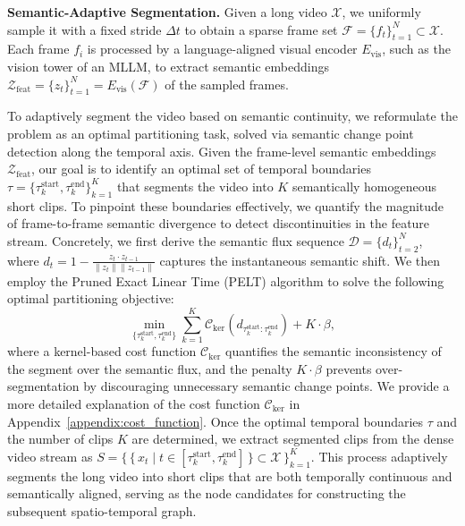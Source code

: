 \clearpage
\setcounter{page}{1}
\maketitlesupplementary


\noindent\textbf{Semantic-Adaptive Segmentation.} Given a long video $\mathcal{X}$, we uniformly sample it with a fixed stride $\Delta t$ to obtain a sparse frame set $\mathcal{F} = \{ f_t \}_{t=1}^{N} \subset \mathcal{X}$. Each frame $f_i$ is processed by a language-aligned visual encoder $E_{\mathrm{vis}}$, such as the vision tower of an MLLM, to extract semantic embeddings $ \mathcal{Z}_{\text{feat}} = \{ z_t \}_{t=1}^{N} = E_{\mathrm{vis}}(\mathcal{F})$ of the sampled frames.

To adaptively segment the video based on semantic continuity, we reformulate the problem as an optimal partitioning task, solved via semantic change point detection along the temporal axis. Given the frame-level semantic embeddings $\mathcal{Z}_\text{feat}$, our goal is to identify an optimal set of temporal boundaries $\tau = \{\tau_k^{\text{start}}, \tau_k^{\text{end}}\}_{k=1}^{K}$ that segments the video into $K$ semantically homogeneous short clips. To pinpoint these boundaries effectively, we quantify the magnitude of frame-to-frame semantic divergence to detect discontinuities in the feature stream. Concretely, we first derive the semantic flux sequence $\mathcal{D}=\{d_t\}_{t=2}^N$, where $d_t = 1 - \frac{z_t \cdot z_{t-1}}{\|z_t\|\|z_{t-1}\|}$ captures the instantaneous semantic shift. We then employ the Pruned Exact Linear Time (PELT) algorithm to solve the following optimal partitioning objective:
\begin{equation}
\min_{\{ \tau_k^{\text{start}}, \tau_k^{\text{end}} \}}
\sum_{k=1}^K \mathcal{C}_{\text{ker}}(d_{\tau_k^{\text{start}} : \tau_k^{\text{end}}})
+ K \cdot \beta,
\end{equation}
where a kernel-based cost function $\mathcal{C}_{\text{ker}}$ quantifies the semantic inconsistency of the segment over the semantic flux, and the penalty $K\cdot\beta$ prevents over-segmentation by discouraging unnecessary semantic change points. We provide a more detailed explanation of the cost function $\mathcal{C}_{\text{ker}}$ in Appendix~\ref{appendix:cost_function}. Once the optimal temporal boundaries $\tau$ and the number of clips $K$ are determined, we extract segmented clips from the dense video stream as $S = \{\, \{\, x_t \mid t \in [\tau_k^{\text{start}}, \tau_k^{\text{end}}] \,\} \subset \mathcal{X} \,\}_{k=1}^{K}$. This process adaptively segments the long video into short clips that are both temporally continuous and semantically aligned, serving as the node candidates for constructing the subsequent spatio-temporal graph.
